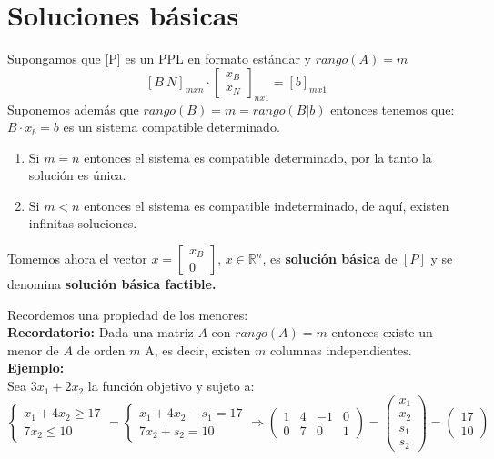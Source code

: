 \documentclass[11pt,fleqn]{book} %
\begin{document}
\section{Soluciones básicas}
\begin{definition}
	Supongamos que [P] es un PPL en formato estándar y $rango(A)=m$
	$$ [B ~ N] _{mxn} \cdot \left[\begin{array}{c}
	x_B \\
	x_N
	\end{array}\right]_{nx1}=[b]_{mx1}
	$$
	Suponemos además que $rango(B)=m=rango(B | b)$ entonces tenemos que:
	$ B \cdot x_b=b$ es un sistema compatible determinado.
	
	\begin{enumerate}
		\item Si $m=n$ entonces el sistema es compatible determinado, por la tanto la solución es única.
		\item Si $m<n$ entonces el sistema es compatible indeterminado, de aquí, existen infinitas soluciones.
	\end{enumerate}
	Tomemos ahora el vector $x=\left[\begin{array}{c}
	x_B \\
	0
	\end{array}\right]$, $x \in \mathbb{R}^n$, es \textbf{solución básica} de $[P]$ y se denomina \textbf{solución básica factible.}
	\end{definition}
Recordemos una propiedad de los menores: \\
\textbf{Recordatorio: } Dada una matriz $A$ con $rango(A)=m$ entonces existe un menor de $A$ de orden $m$ A, es decir, existen $m$ columnas independientes. \\
\textbf{Ejemplo: } \\
Sea $3x_1+2x_2$ la función objetivo y sujeto a:
\begin{equation*}
\left\lbrace
\begin{array}{l}
x_1+4x_2 \geq 17 \\
7x_2 \leq 10
\end{array}
\right.
=
\left\lbrace
\begin{array}{l}
x_1+4x_2 -s_1= 17 \\
7x_2 + s_2 = 10
\end{array}
\right.\Rightarrow
\left(\begin{array}{cc|cc}
	1&4&-1&0\\
	0&7&0&1
\end{array}\right)=
\left(\begin{array}{c}
	x_1 \\
	 x_2 \\
	  s_1 \\
	   s_2
\end{array}\right)
=
\left(\begin{array}{c}
17\\10
\end{array}\right)
\end{equation*}
\end{document}

